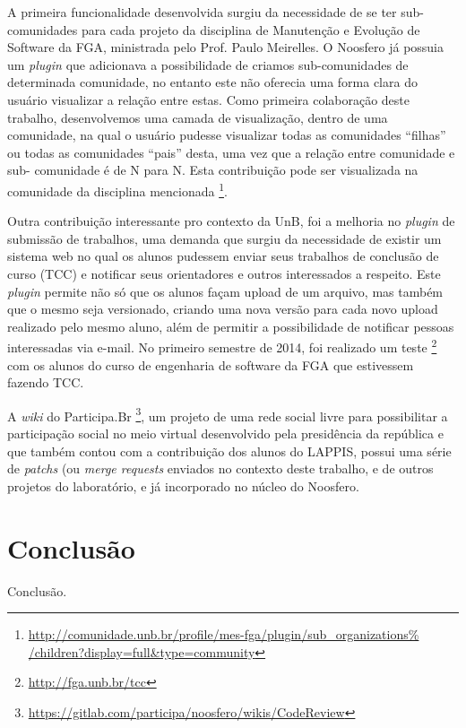 \documentclass[12pt]{article}
\begin{document}
A primeira funcionalidade desenvolvida surgiu da necessidade de se ter sub-%
comunidades para cada projeto da disciplina de Manutenção e Evolução de
Software da FGA, ministrada pelo Prof. Paulo Meirelles. O Noosfero já possuia
um \textit{plugin} que adicionava a possibilidade de criamos sub-comunidades
de determinada comunidade, no entanto este não oferecia uma forma clara do
usuário visualizar a relação entre estas. Como primeira colaboração deste
trabalho, desenvolvemos uma camada de visualização, dentro de uma comunidade,
na qual o usuário pudesse visualizar todas as comunidades ``filhas'' ou todas
as comunidades ``pais'' desta, uma vez que a relação entre comunidade e sub-%
comunidade é de N para N. Esta contribuição pode ser visualizada na comunidade
da disciplina mencionada%
\footnote{\url{http://comunidade.unb.br/profile/mes-fga/plugin/sub_organizations%
/children?display=full&type=community}}.

Outra contribuição interessante pro contexto da UnB, foi a melhoria no
\textit{plugin} de submissão de trabalhos, uma demanda que surgiu da
necessidade de existir um sistema web no qual os alunos pudessem enviar
seus trabalhos de conclusão de curso (TCC) e notificar seus orientadores e outros
interessados a respeito. Este \textit{plugin} permite não só que os alunos
façam upload de um arquivo, mas também que o mesmo seja versionado, criando
uma nova versão para cada novo upload realizado pelo mesmo aluno, além de
permitir a possibilidade de notificar pessoas interessadas via e-mail.
No primeiro semestre de 2014, foi realizado um teste%
\footnote{\url{http://fga.unb.br/tcc}} com os alunos do curso de engenharia de
software da FGA que estivessem fazendo TCC.

A \textit{wiki} do Participa.Br%
\footnote{\url{https://gitlab.com/participa/noosfero/wikis/CodeReview}},
um projeto de uma rede social livre para
possibilitar a participação social no meio virtual desenvolvido pela
presidência da república e que também contou com a contribuição dos alunos
do LAPPIS, possui uma série de \textit{patchs} (ou \textit{merge requests}
enviados no contexto deste trabalho, e de outros projetos do laboratório, e
já incorporado no núcleo do Noosfero.

\section{Conclusão} \label{sec:conclusao}


Conclusão.



\end{document}
